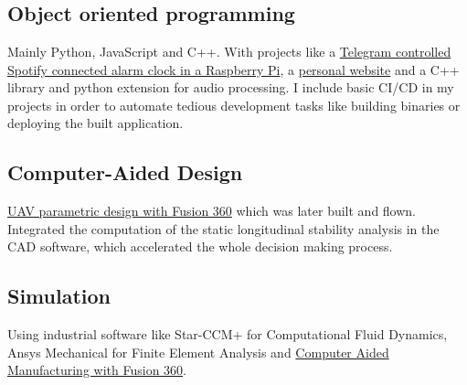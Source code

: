  \section*{\faWrench} \label{sec:skills}

\subsection{Object oriented programming}
Mainly Python, JavaScript and C++. With projects like a
\href{https://github.com/esdandreu/WakePi}{Telegram controlled Spotify
connected alarm clock in a Raspberry Pi}, a
\href{https://github.com/esdandreu/esdandreu.github.io}{personal website}
and a C++ library and python extension for audio processing. I include basic
CI/CD in my projects in order to automate tedious development tasks like
building binaries or deploying the built application.

\subsection{Computer-Aided Design}
\href{https://1drv.ms/b/s!AqZvnCxLmXx9hL9DSw-Ee4zU6H5Rcw?e=8hDatB}{UAV
    parametric design with Fusion 360} which was later built and flown. Integrated
the computation of the static longitudinal stability analysis in the CAD
software, which accelerated the whole decision making process.

\subsection{Simulation}
Using industrial software like Star-CCM+ for Computational Fluid Dynamics, Ansys
Mechanical for Finite Element Analysis and
\href{https://upvedues-my.sharepoint.com/:v:/g/personal/angibo2_upv_edu_es/EdjN2F7wqulLhB52aju3Q_cBvuYI8B9KSRrEgAU7Ta_I_g?e=SFogxW}{Computer
Aided Manufacturing with Fusion 360}. 